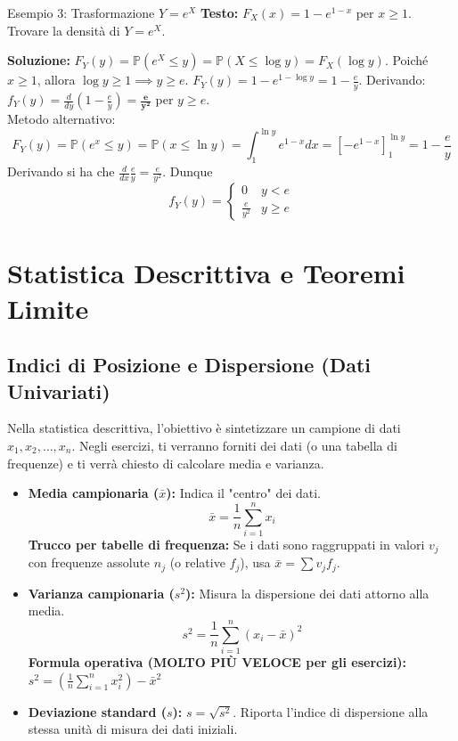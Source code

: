 \documentclass[12pt]{extarticle} %
\begin{document}
\begin{eserciziobox}{Esempio 3: Trasformazione \mbox{$Y=e^X$}}
\textbf{Testo:} $F_X(x) = 1 - e^{1-x}$ per $x \ge 1$. Trovare la densità di $Y=e^X$.
\par\textbf{Soluzione:}
$F_Y(y) = \mathbb{P}(e^X \le y) = \mathbb{P}(X \le \log y) = F_X(\log y)$.
Poiché $x \ge 1$, allora $\log y \ge 1 \implies y \ge e$.
$F_Y(y) = 1 - e^{1-\log y} = 1 - \frac{e}{y}$.
Derivando: $f_Y(y) = \frac{d}{dy}(1 - \frac{e}{y}) = \mathbf{\frac{e}{y^2}}$ per $y \ge e$.\\

\noindent Metodo alternativo:
$$
F_Y(y)=\mathbb{P}(e^x \le y) = \mathbb{P}(x \le \ln y) = \int_1^{\ln y} e^{1-x}dx = [-e^{1-x}]_1^{\ln y} = 1-\frac{e}{y}
$$
Derivando si ha che $\frac{d}{dx}\frac{e}{y} = \frac{e}{y^2}$. Dunque
$$
f_Y(y) = \begin{cases}
    0 & y < e\\
    \frac{e}{y^2} & y \ge e
\end{cases}
$$
\end{eserciziobox}


\newpage


\section{Statistica Descrittiva e Teoremi Limite}

\subsection{Indici di Posizione e Dispersione (Dati Univariati)}
Nella statistica descrittiva, l'obiettivo è sintetizzare un campione di dati $x_1, x_2, \dots, x_n$. 
Negli esercizi, ti verranno forniti dei dati (o una tabella di frequenze) e ti verrà chiesto di calcolare media e varianza.

\begin{itemize}
    \item \textbf{Media campionaria ($\bar{x}$):} Indica il "centro" dei dati.
    $$ \bar{x} = \frac{1}{n} \sum_{i=1}^{n} x_i $$
    {\footnotesize\textbf{Trucco per tabelle di frequenza:} Se i dati sono raggruppati in valori $v_j$ con frequenze assolute $n_j$ (o relative $f_j$), usa $\bar{x} = \sum v_j f_j$.}
    
    \item \textbf{Varianza campionaria ($s^2$):} Misura la dispersione dei dati attorno alla media.
    $$ s^2 = \frac{1}{n} \sum_{i=1}^{n} (x_i - \bar{x})^2 $$
    {\footnotesize\textbf{Formula operativa (MOLTO PIÙ VELOCE per gli esercizi):}
    $ s^2 = \left( \frac{1}{n} \sum_{i=1}^{n} x_i^2 \right) - \bar{x}^2 $}
    \item \textbf{Deviazione standard ($s$):} $s = \sqrt{s^2}$. Riporta l'indice di dispersione alla stessa unità di misura dei dati iniziali.
\end{itemize}
\end{document}

